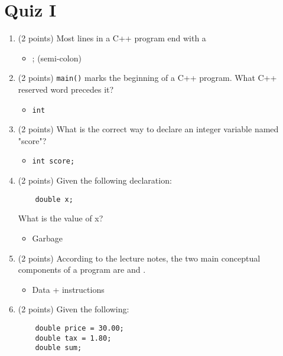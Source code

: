 \documentclass{report}
\begin{document}
    \section{\LARGE Quiz I}
    \bigbreak \noindent 
    \begin{enumerate}
    \item (2 points) Most lines in a C++ program end with a
    \begin{itemize}
        \item ; (semi-colon)
    \end{itemize}
    
    \item (2 points) \texttt{main()} marks the beginning of a C++ program. What C++ reserved word precedes it?
    \begin{itemize}
        \item \texttt{int}
    \end{itemize}
    
    \item (2 points) What is the correct way to declare an integer variable named "score"?
    \begin{itemize}
        \item \texttt{int score;}
    \end{itemize}
    
    \item (2 points) Given the following declaration:
    \begin{verbatim}
    double x;
    \end{verbatim}
    What is the value of x?
    \begin{itemize}
        \item Garbage
    \end{itemize}
    
    \item (2 points) According to the lecture notes, the two main conceptual components of a program are \underline{\hspace{2cm}} and \underline{\hspace{2cm}}.
        \begin{itemize}
            \item Data + instructions
        \end{itemize}
    
    \item (2 points) Given the following:
    \begin{verbatim}
    double price = 30.00;
    double tax = 1.80;
    double sum;


\end{verbatim}
\end{enumerate}
\end{document}
